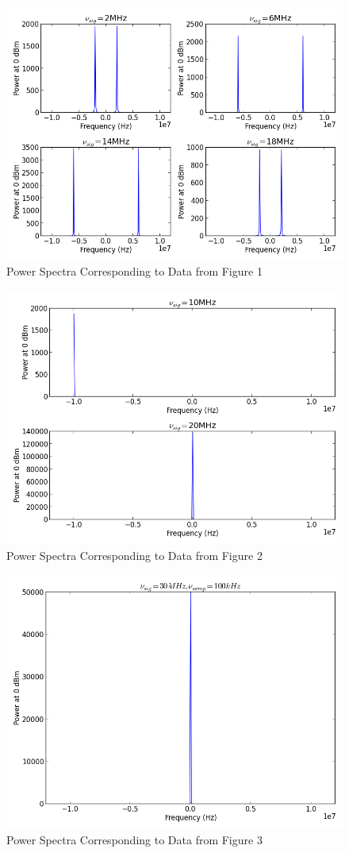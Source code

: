 \documentclass[12pt]{article}
\begin{document}
\begin{figure}[!hp]
\caption{Power Spectra Corresponding to Data from Figure 1}
\centering
\includegraphics[width=.75\textwidth]{specsample1.png}\end{figure}
\begin{figure}[!hp]
\caption{Power Spectra Corresponding to Data from Figure 2}
\centering
\includegraphics[width=.75\textwidth]{specsample2.png}\end{figure}
\begin{figure}[!hp]
\caption{Power Spectra Corresponding to Data from Figure 3}
\centering
\includegraphics[width=.75\textwidth]{specsample3.png}\end{figure}
\newpage
\end{document}
